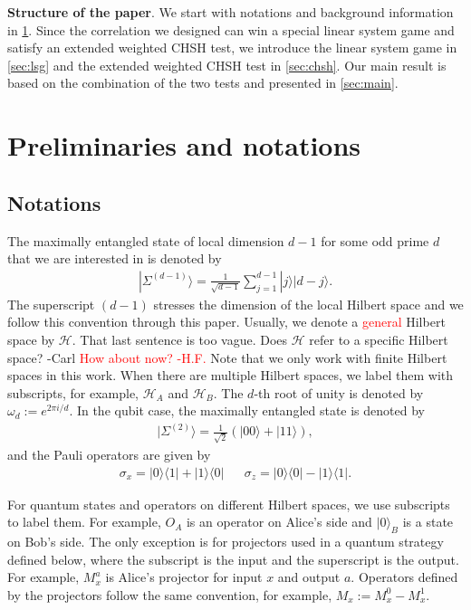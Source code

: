 \documentclass[11pt,letterpaper]{article}
\newcommand{\ket}[1]{|#1\rangle}
\newcommand{\ketbra}[2]{|#1\rangle\langle#2|}
\newcommand{\calH}{\mathcal{H}}
\newcommand{\1}{\mathbb{1}}
\newcommand{\EPR}[1]{\Sigma^{(#1)}}
\newcommand{\paulix}{\sigma_x}
\newcommand{\pauliz}{\sigma_z}
\def\carl#1{{\color{blue} #1 -Carl}}
\newcommand{\hf}[1]{\textcolor{red}{#1}}
\newcommand{\hfc}[1]{\textcolor{red}{#1 -H.F.}}
\theoremstyle{definition}
\begin{document}
\textbf{Structure of the paper}.
We start with notations and background information in \cref{sec:prelim}.
Since the correlation we designed can win a special linear system game and satisfy
an extended weighted CHSH test, we introduce the linear system game
in \cref{sec:lsg} and the extended weighted CHSH test in \cref{sec:chsh}. 
Our main result is based on the combination of the two tests and presented in \cref{sec:main}. 

\section{Preliminaries and notations}
\label{sec:prelim}
\subsection{Notations}
The maximally entangled state of local dimension $d-1$ for some odd prime $d$ that we are interested in is denoted by
\begin{align}
\ket{\EPR{d-1}} = \frac{1}{\sqrt{d-1}} \sum_{j = 1}^{d-1} \ket{j}\ket{d-j}.
\end{align}
The superscript $(d-1)$ stresses the dimension of the local Hilbert space and we follow this convention through this paper.
Usually, we denote a \hf{general} Hilbert space by $\calH$.  
\carl{That last sentence is too vague.  Does $\calH$ refer to a specific Hilbert space?}
\hfc{How about now?}
Note that we only work with finite Hilbert spaces in this work.
When there are multiple Hilbert spaces, we label them with subscripts, for example, $\calH_A$ and
$\calH_B$.
The $d$-th root of unity is denoted by $\omega_d:=e^{2\pi i/d}$. In the qubit case, 
the maximally entangled state is denoted by 
\begin{align}
	\ket{\EPR{2}} = \frac{1}{\sqrt{2}}(\ket{00} + \ket{11}),
\end{align}
and the Pauli operators are given by
\begin{align}
	\paulix = \ketbra{0}{1}+\ketbra{1}{0} && \pauliz = \ketbra{0}{0} - \ketbra{1}{1}.
\end{align}

For quantum states and operators on different Hilbert spaces, we use subscripts to label them.
For example, $O_A$ is an operator on Alice's side and $\ket{0}_{B}$ is a state on Bob's side. 
The only exception is for projectors used in a quantum strategy defined below, where the subscript 
is the input and the superscript is the output. For example, $M_x^a$ is Alice's projector for input $x$ and output $a$.
Operators defined by the projectors follow the same convention, for example, $M_x := M_x^0 - M_x^1$.
\end{document}
